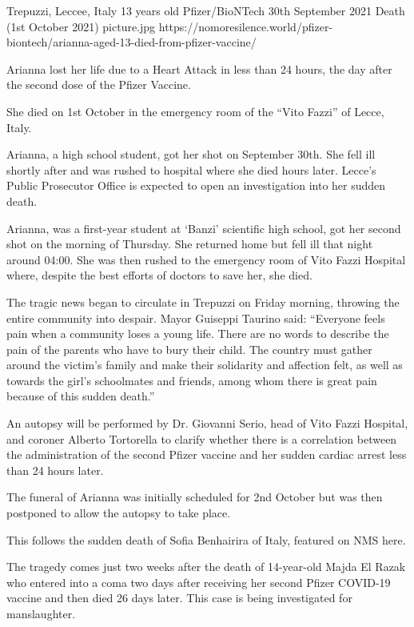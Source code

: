 {Trepuzzi, Leccee, Italy}
{13 years old}
{Pfizer/BioNTech}
{30th September 2021}
{Death (1st October 2021)}
{picture.jpg}
{https://nomoresilence.world/pfizer-biontech/arianna-aged-13-died-from-pfizer-vaccine/}
{

Arianna lost her life due to a Heart Attack in less than 24 hours, the day after
the second dose of the Pfizer Vaccine.

She died on 1st October in the emergency room of the “Vito Fazzi” of Lecce,
Italy.

Arianna, a high school student, got her shot on September 30th. She fell ill
shortly after and was rushed to hospital where she died hours later. Lecce’s
Public Prosecutor Office is expected to open an investigation into her sudden
death.

Arianna, was a first-year student at ‘Banzi’ scientific high school, got her
second shot on the morning of Thursday. She returned home but fell ill that
night around 04:00. She was then rushed to the emergency room of Vito Fazzi
Hospital where, despite the best efforts of doctors to save her, she died.

The tragic news began to circulate in Trepuzzi on Friday morning, throwing the
entire community into despair. Mayor Guiseppi Taurino said: “Everyone feels pain
when a community loses a young life. There are no words to describe the pain of
the parents who have to bury their child. The country must gather around the
victim’s family and make their solidarity and affection felt, as well as towards
the girl’s schoolmates and friends, among whom there is great pain because of
this sudden death.”

An autopsy will be performed by Dr. Giovanni Serio, head of Vito Fazzi Hospital,
and coroner Alberto Tortorella to clarify whether there is a correlation between
the administration of the second Pfizer vaccine and her sudden cardiac arrest
less than 24 hours later.

The funeral of Arianna was initially scheduled for 2nd October but was then
postponed to allow the autopsy to take place.

This follows the sudden death of Sofia Benhairira of Italy, featured on NMS
here.

The tragedy comes just two weeks after the death of 14-year-old Majda El Razak
who entered into a coma two days after receiving her second Pfizer COVID-19
vaccine and then died 26 days later. This case is being investigated for
manslaughter.

}
